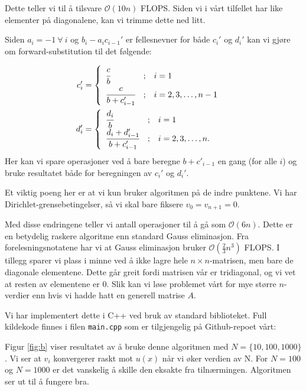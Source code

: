 \documentclass[11pt]{article}
\begin{document}
Dette teller vi til å tilsvare $\mathcal{O}(10n)$ FLOPS. Siden vi i
vårt tilfellet har like elementer på diagonalene, kan vi trimme dette
ned litt. 

Siden $a_i = -1\ \forall\  i$ og  $b_i - a_ic_{i-1}'$ er fellesnevner
for både $c_i'$ og $d_i'$ kan vi gjøre om forward-substitution til det følgende:

\begin{align*}
  c_i' &= \begin{cases}
\begin{array}{lcl}
  \cfrac{c}{b}                  & ; & i = 1 \\
  \cfrac{c}{b + c'_{i - 1}} & ; & i = 2, 3, \dots, n-1 \\
\end{array}
\end{cases}\\
d_i' &= \begin{cases}
\begin{array}{lcl}
  \cfrac{d_i}{b}                  & ; & i = 1 \\
  \cfrac{d_i + d'_{i - 1}}{b + c'_{i - 1}} & ; & i = 2, 3, \dots, n. \\
\end{array}
\end{cases}
\end{align*}
Her kan vi spare operasjoner ved å bare beregne $b+c'_{i-1}$ en gang
(for alle $i$) og bruke resultatet både for beregningen av $c_{i}'$ og
$d_{i}'$.


Et viktig poeng her er at vi kun bruker algoritmen på de indre
punktene. Vi har Dirichlet-grensebetingelser, så vi skal bare fiksere
$v_0 = v_{n+1} = 0$.


Med disse endringene teller vi antall operasjoner til å gå som
$\mathcal{O}(6n)$. Dette er en betydelig raskere algoritme enn standard Gauss eliminasjon. Fra forelesningsnotatene
har vi at Gauss eliminasjon bruker $\mathcal{O}(\frac{ 2 }{ 3 }n^3)$ FLOPS. I tillegg sparer vi plass i minne ved å ikke lagre hele $n \times n$-matrisen, men bare de diagonale elementene. Dette går greit fordi matrisen vår er tridiagonal, og vi vet at resten av elementene er 0. Slik kan vi løse problemet vårt for mye større $n$-verdier enn hvis vi hadde hatt en generell matrise $A$.

Vi har implementert dette i C++ ved bruk av standard biblioteket. Full
kildekode finnes i filen \texttt{main.cpp} som er tilgjengelig på
Github-repoet vårt\footnotemark[1]:

Figur \ref{fig:b} viser resultatet av å bruke denne algoritmen med
$N = \{10,100,1000\}$. Vi ser at $v_i$ konvergerer raskt mot $u(x)$
når vi øker verdien av N. For $N=100$ og $N=1000$ er det vanskelig å
skille den eksakte fra tilnærmingen. Algoritmen ser ut til å fungere bra.
\end{document}
